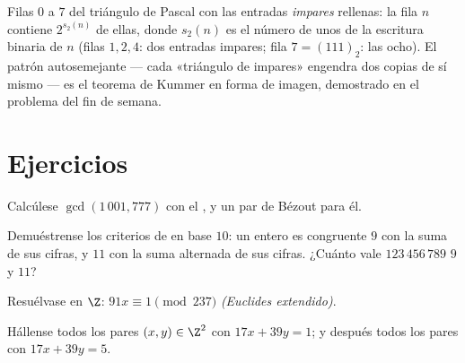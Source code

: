 \begin{omfigure}

{\small Filas $0$ a $7$ del triángulo de Pascal con las entradas
\emph{impares} rellenas: la fila $n$ contiene $2^{s_2(n)}$ de ellas,
donde $s_2(n)$ es el número de unos de la escritura binaria de $n$
(filas $1, 2, 4$: dos entradas impares; fila $7 = (111)_2$: las ocho).
El patrón autosemejante --- cada «triángulo de impares» engendra dos
copias de sí mismo --- es el teorema de Kummer en forma de imagen,
demostrado en el problema del fin de semana.}
\end{omfigure}

\section{Ejercicios}

\begin{exercise}[$\star$]\label{exo:b1:arith:1}
Calcúlese $\gcd(1\,001, 777)$ con el , y un par
de Bézout para él.
\end{exercise}

\begin{exercise}[$\star$]\label{exo:b1:arith:2}
Demuéstrense los criterios de  en base $10$: un entero es
congruente  $9$ con la suma de sus cifras, y  $11$ con la
suma alternada de sus cifras. ¿Cuánto vale $123\,456\,789$  $9$ y  $11$?
\end{exercise}

\begin{exercise}[$\star$]\label{exo:b1:arith:3}
Resuélvase en $\Z$: $91x \equiv 1 \pmod{237}$ \emph{(Euclides extendido)}.
\end{exercise}

\begin{exercise}[$\star$]\label{exo:b1:arith:4}
Hállense todos los pares $(x, y) \in \Z^2$ con $17x + 39y = 1$; y
después todos los pares con $17 x + 39 y = 5$.
\end{exercise}

